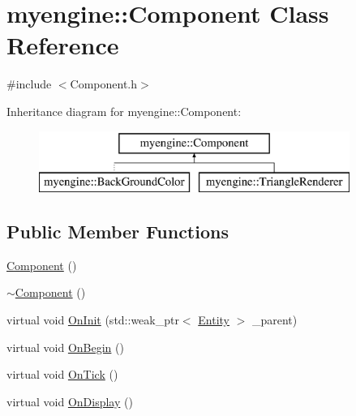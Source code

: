 \hypertarget{classmyengine_1_1_component}{}\section{myengine\+:\+:Component Class Reference}
\label{classmyengine_1_1_component}


{\ttfamily \#include $<$Component.\+h$>$}

Inheritance diagram for myengine\+:\+:Component\+:\begin{figure}[H]
\begin{center}
\leavevmode
\includegraphics[height=2.000000cm]{classmyengine_1_1_component}
\end{center}
\end{figure}
\subsection*{Public Member Functions}
\begin{DoxyCompactItemize}
\item 
\hyperlink{classmyengine_1_1_component_ae49096ab7e0b46617d28206315bef1a9}{Component} ()
\item 
\hyperlink{classmyengine_1_1_component_ae2938d7961851517b781318a9005ba2c}{$\sim$\+Component} ()
\item 
virtual void \hyperlink{classmyengine_1_1_component_a66aeffd4cb32f438a4fc604e74e50057}{On\+Init} (std\+::weak\+\_\+ptr$<$ \hyperlink{classmyengine_1_1_entity}{Entity} $>$ \+\_\+parent)
\item 
virtual void \hyperlink{classmyengine_1_1_component_ac852700a0c7227ca7229ae8c9ec4aa2d}{On\+Begin} ()
\item 
virtual void \hyperlink{classmyengine_1_1_component_ac84472ba368a622afa0e25c47757291a}{On\+Tick} ()
\item 
virtual void \hyperlink{classmyengine_1_1_component_ade43a7a8f4f8954b45ed05e1a8898eae}{On\+Display} ()
\end{DoxyCompactItemize}
